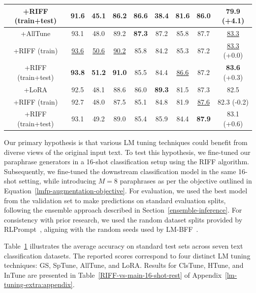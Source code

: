 \documentclass[11pt]{article}
\begin{document}
\begin{table}
\begin{tabular}{c | c | c | c | c | c | c | c || c }
\tiny+RIFF (train+test) & \small91.6 & \small45.1 & \small86.2 & \small86.6 & \small38.4 & \small81.6 & \small 86.0 &\;\;\;\;\;\;\;\;\small79.9 (+4.1) \\
\hline
\small +AllTune & \small93.1 & \small48.0 & \small89.2 & \small\textbf{87.3} & \small87.2 & \small85.8 & \small 87.7 & \small\underline{83.3}\\
\tiny+RIFF (train) & \small\underline{93.6} & \small\underline{50.6} & \small\underline{90.2} & \small85.8 & \small84.2 & \small85.3 & \small 87.2 &\;\;\;\;\;\;\;\;\small\underline{83.3} (+0.0)\\
\tiny+RIFF (train+test) & \small\textbf{93.8} & \small\textbf{51.2} & \small\textbf{91.0} & \small85.5 & \small84.4 & \small\underline{86.6} & \small 87.2 &\;\;\;\;\;\;\;\;\small\textbf{83.6} (+0.3)\\
\hline
\small +LoRA & \small92.5 & \small48.1 & \small88.6 & \small86.0 & \small\textbf{89.3} & \small81.5 & \small 87.3 & \small82.5 \\
\tiny+RIFF (train) & \small92.7 & \small48.0 & \small87.5 & \small85.1 & \small84.8 & \small81.9 & \small \underline{87.6} &\;\;\;\;\;\;\;\;\small82.3 (-0.2)\\
\tiny+RIFF (train+test) & \small93.1 & \small49.2 & \small89.0 & \small85.4 & \small85.9 & \small84.4 & \small \textbf{87.9} &\;\;\;\;\;\;\;\;\small83.1 (+0.6)\\
\hline
\end{tabular}
\label{RIFF-vs-main-16-shot}
\end{table}

Our primary hypothesis is that various LM tuning techniques could benefit from diverse views of the original input text. To test this hypothesis, we fine-tuned our paraphrase generators in a 16-shot classification setup using the RIFF algorithm. Subsequently, we fine-tuned the downstream classification model in the same 16-shot setting, while introducing $M=8$ paraphrases as per the objective outlined in Equation~\ref{lmfp-augmentation-objective}. For evaluation, we used the best model from the validation set to make predictions on standard evaluation splits, following the ensemble approach described in Section~\ref{ensemble-inference}.
For consistency with prior research, we used the random dataset splits provided by RLPrompt~\cite{deng-etal-2022-rlprompt}, aligning with the random seeds used by LM-BFF~\cite{gao-etal-2021-making}.


Table~\ref{RIFF-vs-main-16-shot} illustrates the average accuracy on standard test sets across seven text classification datasets. The reported scores correspond to four distinct LM tuning techniques: GS, SpTune, AllTune, and LoRA. Results for ClsTune, HTune, and InTune are presented in Table~\ref{RIFF-vs-main-16-shot-rest} of Appendix~\ref{lm-tuning-extra:appendix}.
\end{document}
